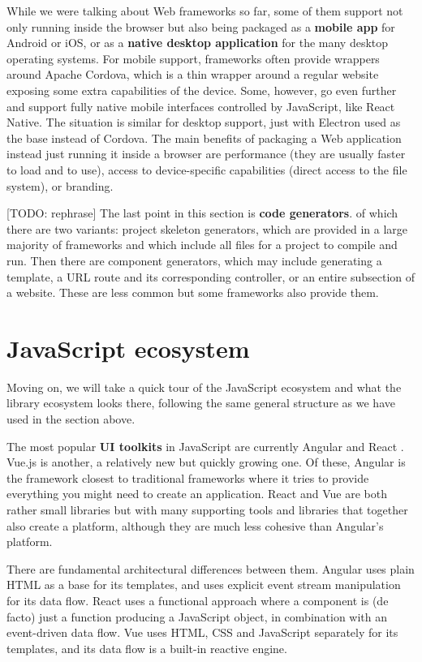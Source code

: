 \documentclass[english,odsaz]{fitthesis}
\begin{document}
While we were talking about Web frameworks so far, some of them support not only
running inside the browser but also being packaged as a \textbf{mobile app} for Android
or iOS, or as a \textbf{native desktop application} for the many desktop operating
systems. For mobile support, frameworks often provide wrappers around Apache
Cordova, which is a thin wrapper around a regular website exposing some extra
capabilities of the device. Some, however, go even further and support fully
native mobile interfaces controlled by JavaScript, like React Native. The
situation is similar for desktop support, just with Electron used as the base
instead of Cordova. The main benefits of packaging a Web application instead
just running it inside a browser are performance (they are usually faster to
load and to use), access to device-specific capabilities (direct access to the
file system), or branding.

[TODO: rephrase] The last point in this section is \textbf{code generators}. of which
there are two variants: project skeleton generators, which are provided in a
large majority of frameworks and which include all files for a project to
compile and run. Then there are component generators, which may include
generating a template, a URL route and its corresponding controller, or an
entire subsection of a website. These are less common but some frameworks also
provide them.

\section{JavaScript ecosystem}
\label{sec:orgb82ef4e}
Moving on, we will take a quick tour of the JavaScript ecosystem and what the
library ecosystem looks there, following the same general structure as we have
used in the section above.

The most popular \textbf{UI toolkits} in JavaScript are currently Angular \cite{angular}
and React \cite{react}. Vue.js \cite{vuejs} is another, a relatively new but quickly
growing one. Of these, Angular is the framework closest to traditional
frameworks where it tries to provide everything you might need to create an
application. React and Vue are both rather small libraries but with many
supporting tools and libraries that together also create a platform, although
they are much less cohesive than Angular's platform.

There are fundamental architectural differences between them. Angular uses plain
HTML as a base for its templates, and uses explicit event stream manipulation
for its data flow. React uses a functional approach where a component is (de
facto) just a function producing a JavaScript object, in combination with an
event-driven data flow. Vue uses HTML, CSS and JavaScript separately for its
templates, and its data flow is a built-in reactive engine.
\end{document}
